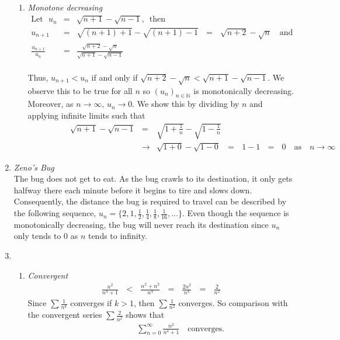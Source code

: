 \documentclass[12pt]{amsart}
\begin{document}
\begin{enumerate}
\begin{enumerate}
			\item \emph{Monotone decreasing}
			\begin{eqnarray}
					\text{Let} \text{ } u_n & = & \sqrt{n+1}-\sqrt{n-1} \text{, } \text{ then} \nonumber \\
					u_{n+1}  & = & \sqrt{(n+1)+1}-\sqrt{(n+1)-1} \text{ } = \text{ } \sqrt{n+2}-\sqrt{n} \text{ }						\text{ and}\nonumber \\
					\frac{u_{n+1}}{u_n} & = & \frac{\sqrt{n+2}-\sqrt{n}}{\sqrt{n+1}-\sqrt{n-1}} \nonumber	
				\end{eqnarray}\\	
			Thus, $u_{n+1}<u_n$ if and only if $\sqrt{n+2}-\sqrt{n} < \sqrt{n+1}-\sqrt{n-1}$. We observe this
			to be true for all $n$ so $(u_n)_{n \in \mathbb{N}}$ is monotonically decreasing. \\	
			Moreover, as $n \rightarrow \infty  \text{, } u_n \rightarrow 0$. We show this by dividing by $n$ 				and applying infinite limits such that
			\begin{eqnarray}
					\hspace{2cm} \sqrt{n+1} - \sqrt{n-1} & = & \sqrt{1+\frac{1}{n}} - \sqrt{1-\frac{1}{n}} 						\nonumber \\
					& \longrightarrow & \sqrt{1+0} - \sqrt{1-0} \text{ } = \text{ } 1-1 \text{ } = \text{ } 0 \text{ }
					\text{ as } \text{ } n \longrightarrow \infty \nonumber
				\end{eqnarray}
		
		\end{enumerate}
		
	\item \emph{Zeno's Bug} \\
	The bug does not get to eat. As the bug crawls to its destination, it only gets halfway there each minute 		before it begins to tire and slows down. Consequently, the distance the bug is required to travel can be 		described by the following sequence, $u_n=\{2,1,\frac{1}{2},\frac{1}{4},\frac{1}{8},\frac{1}{16},...\}$.  Even 
	though the sequence is monotonically decreasing, the bug will never reach its destination since 	
	$u_n$ only tends to 0 as $n$ tends to infinity. \\
					
	\item 
	
		\begin{enumerate}
		
			\item \emph{Convergent}
				\begin{eqnarray}
					\frac{n^2}{n^4+1} \text{ } < \text{ } \frac{n^2+n^2}{n^4} \text{ } = \text{ } 
					\frac{2n^2}{n^4} \text{ } = \text{ } \frac{2}{n^2} \nonumber
				\end{eqnarray}
			Since $\sum \frac{1}{n^k}$ converges if  $k>1$, then $\sum \frac{1}{n^2}$ converges. So 
			comparison with the convergent series $\sum \frac{2}{n^2}$ shows that 
				\begin{eqnarray}
					\hspace{2cm} \sum^\infty_{n=0} \frac{n^2}{n^4+1} \text{ } \text{ converges.} 							\nonumber
				\end{eqnarray}	
										

\end{enumerate}
\end{enumerate}
\end{document}
